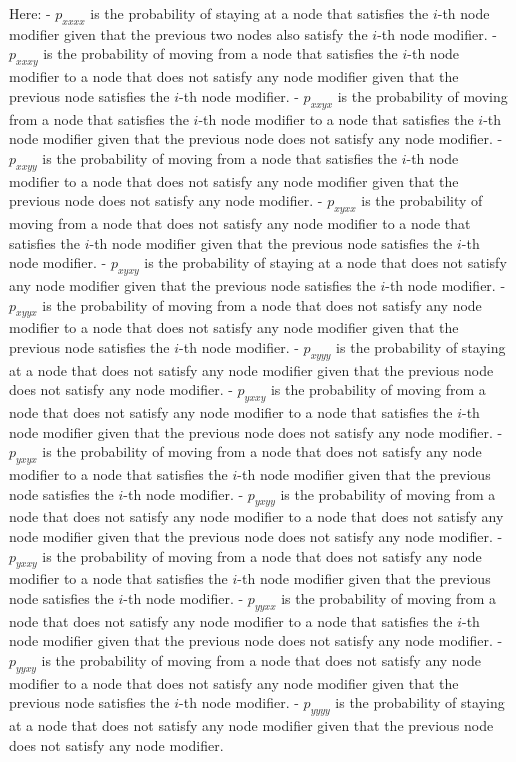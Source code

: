 Here:
- \(p_{xxxx}\) is the probability of staying at a node that satisfies the \(i\)-th node modifier given that the previous two nodes also satisfy the \(i\)-th node modifier.
- \(p_{xxxy}\) is the probability of moving from a node that satisfies the \(i\)-th node modifier to a node that does not satisfy any node modifier given that the previous node satisfies the \(i\)-th node modifier.
- \(p_{xxyx}\) is the probability of moving from a node that satisfies the \(i\)-th node modifier to a node that satisfies the \(i\)-th node modifier given that the previous node does not satisfy any node modifier.
- \(p_{xxyy}\) is the probability of moving from a node that satisfies the \(i\)-th node modifier to a node that does not satisfy any node modifier given that the previous node does not satisfy any node modifier.
- \(p_{xyxx}\) is the probability of moving from a node that does not satisfy any node modifier to a node that satisfies the \(i\)-th node modifier given that the previous node satisfies the \(i\)-th node modifier.
- \(p_{xyxy}\) is the probability of staying at a node that does not satisfy any node modifier given that the previous node satisfies the \(i\)-th node modifier.
- \(p_{xyyx}\) is the probability of moving from a node that does not satisfy any node modifier to a node that does not satisfy any node modifier given that the previous node satisfies the \(i\)-th node modifier.
- \(p_{xyyy}\) is the probability of staying at a node that does not satisfy any node modifier given that the previous node does not satisfy any node modifier.
- \(p_{yxxy}\) is the probability of moving from a node that does not satisfy any node modifier to a node that satisfies the \(i\)-th node modifier given that the previous node does not satisfy any node modifier.
- \(p_{yxyx}\) is the probability of moving from a node that does not satisfy any node modifier to a node that satisfies the \(i\)-th node modifier given that the previous node satisfies the \(i\)-th node modifier.
- \(p_{yxyy}\) is the probability of moving from a node that does not satisfy any node modifier to a node that does not satisfy any node modifier given that the previous node does not satisfy any node modifier.
- \(p_{yxxy}\) is the probability of moving from a node that does not satisfy any node modifier to a node that satisfies the \(i\)-th node modifier given that the previous node satisfies the \(i\)-th node modifier.
- \(p_{yyxx}\) is the probability of moving from a node that does not satisfy any node modifier to a node that satisfies the \(i\)-th node modifier given that the previous node does not satisfy any node modifier.
- \(p_{yyxy}\) is the probability of moving from a node that does not satisfy any node modifier to a node that does not satisfy any node modifier given that the previous node satisfies the \(i\)-th node modifier.
- \(p_{yyyy}\) is the probability of staying at a node that does not satisfy any node modifier given that the previous node does not satisfy any node modifier.

